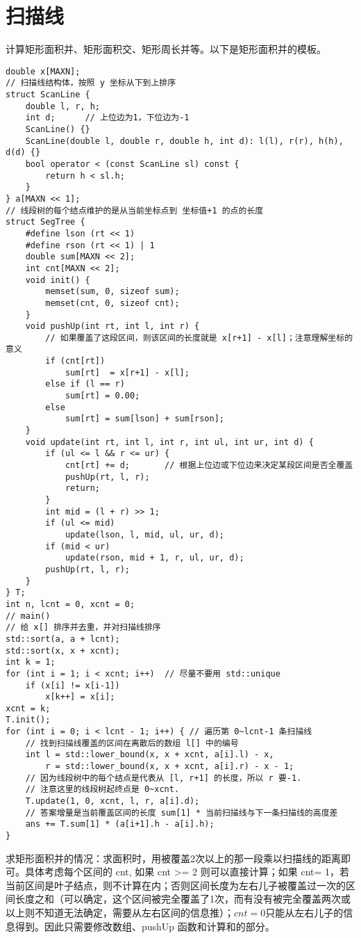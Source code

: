 \section{扫描线}
计算矩形面积并、矩形面积交、矩形周长并等。以下是矩形面积并的模板。
\begin{verbatim}
double x[MAXN];
// 扫描线结构体，按照 y 坐标从下到上排序 
struct ScanLine {
    double l, r, h;
    int d;      // 上位边为1，下位边为-1
    ScanLine() {}
    ScanLine(double l, double r, double h, int d): l(l), r(r), h(h), d(d) {}
    bool operator < (const ScanLine sl) const {
        return h < sl.h;
    }
} a[MAXN << 1];
// 线段树的每个结点维护的是从当前坐标点到 坐标值+1 的点的长度 
struct SegTree {
    #define lson (rt << 1)
    #define rson (rt << 1) | 1
    double sum[MAXN << 2];
    int cnt[MAXN << 2];
    void init() {
        memset(sum, 0, sizeof sum);
        memset(cnt, 0, sizeof cnt);
    }
    void pushUp(int rt, int l, int r) {
        // 如果覆盖了这段区间，则该区间的长度就是 x[r+1] - x[l]；注意理解坐标的意义 
        if (cnt[rt])
            sum[rt]  = x[r+1] - x[l];
        else if (l == r)
            sum[rt] = 0.00;
        else
            sum[rt] = sum[lson] + sum[rson];
    }
    void update(int rt, int l, int r, int ul, int ur, int d) {
        if (ul <= l && r <= ur) {
            cnt[rt] += d;       // 根据上位边或下位边来决定某段区间是否全覆盖 
            pushUp(rt, l, r);
            return;
        }
        int mid = (l + r) >> 1;
        if (ul <= mid)
            update(lson, l, mid, ul, ur, d);
        if (mid < ur)
            update(rson, mid + 1, r, ul, ur, d);
        pushUp(rt, l, r);
    }
} T; 
int n, lcnt = 0, xcnt = 0;
// main()
// 给 x[] 排序并去重，并对扫描线排序
std::sort(a, a + lcnt);
std::sort(x, x + xcnt);
int k = 1;
for (int i = 1; i < xcnt; i++)  // 尽量不要用 std::unique 
    if (x[i] != x[i-1])
        x[k++] = x[i];
xcnt = k;
T.init();
for (int i = 0; i < lcnt - 1; i++) { // 遍历第 0~lcnt-1 条扫描线
    // 找到扫描线覆盖的区间在离散后的数组 l[] 中的编号
    int l = std::lower_bound(x, x + xcnt, a[i].l) - x,
        r = std::lower_bound(x, x + xcnt, a[i].r) - x - 1;
    // 因为线段树中的每个结点是代表从 [l, r+1] 的长度，所以 r 要-1.
    // 注意这里的线段树起终点是 0~xcnt. 
    T.update(1, 0, xcnt, l, r, a[i].d); 
    // 答案增量是当前覆盖区间的长度 sum[1] * 当前扫描线与下一条扫描线的高度差 
    ans += T.sum[1] * (a[i+1].h - a[i].h);
}
\end{verbatim}

\noindent 求矩形面积并的情况：求面积时，用被覆盖2次以上的那一段乘以扫描线的距离即可。具体考虑每个区间的 cnt, 如果 cnt >= 2 则可以直接计算；如果 cnt= 1，若当前区间是叶子结点，则不计算在内；否则区间长度为左右儿子被覆盖过一次的区间长度之和（可以确定，这个区间被完全覆盖了1次，而有没有被完全覆盖两次或以上则不知道无法确定，需要从左右区间的信息推）；$cnt=0$只能从左右儿子的信息得到。因此只需要修改数组、pushUp 函数和计算和的部分。

